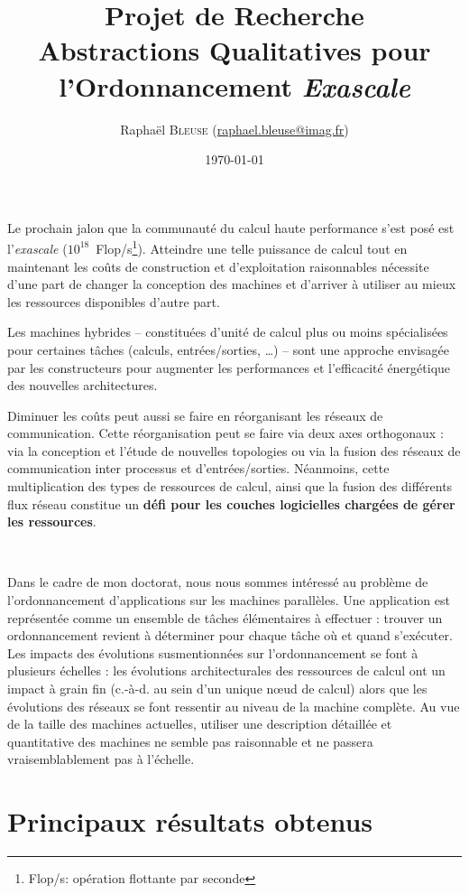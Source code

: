 \documentclass[11pt,final,french]{article}	%
\title{
	Projet de Recherche \\
	\large Abstractions Qualitatives pour l'Ordonnancement \emph{Exascale}
}
\author{
	Raphaël \textsc{Bleuse}
	({\small \href{mailto:raphael.bleuse@imag.fr}{raphael.bleuse@imag.fr}})
}
\date{\today}
\let\todoraw\todo
\renewcommand{\todo}[1]{\todoraw[inline]{#1}}
\newcommand{\cad}{c.-à-d.}
\begin{document}
\maketitle

\todo{ajouter résumé}

Le prochain jalon que la communauté du calcul haute performance s'est posé est
l'\emph{exascale} (\(10^{18}\)~Flop/s\footnote{Flop/s: opération flottante par
seconde}).
%
Atteindre une telle puissance de calcul tout en maintenant les coûts de
construction et d'exploitation raisonnables nécessite d'une part de changer la
conception des machines et d'arriver à utiliser au mieux les ressources
disponibles d'autre part.

Les machines hybrides -- constituées d'unité de calcul plus ou moins
spécialisées pour certaines tâches (calculs, entrées/sorties, …) -- sont une
approche envisagée par les constructeurs pour augmenter les performances et
l'efficacité énergétique des nouvelles architectures.

Diminuer les coûts peut aussi se faire en réorganisant les réseaux de
communication.
%
Cette réorganisation peut se faire via deux axes orthogonaux : via la
conception et l'étude de nouvelles topologies ou via la fusion des réseaux de
communication inter processus et d'entrées/sorties.
%
Néanmoins, cette multiplication des types de ressources de calcul, ainsi que la
fusion des différents flux réseau constitue un \textbf{défi pour les couches
logicielles chargées de gérer les ressources}.

\

Dans le cadre de mon doctorat, nous nous sommes intéressé au problème de
l'ordonnancement d'applications sur les machines parallèles.
%
Une application est représentée comme un ensemble de tâches élémentaires à
effectuer : trouver un ordonnancement revient à déterminer pour chaque tâche où
et quand s'exécuter.
%
Les impacts des évolutions susmentionnées sur l'ordonnancement se font à
plusieurs échelles : les évolutions architecturales des ressources de calcul
ont un impact à grain fin (\cad{} au sein d'un unique nœud de calcul) alors que
les évolutions des réseaux se font ressentir au niveau de la machine complète.
%
Au vue de la taille des machines actuelles, utiliser une description
détaillée et quantitative des machines ne semble pas raisonnable et ne passera
vraisemblablement pas à l'échelle.


\section{Principaux résultats obtenus}
\end{document}
